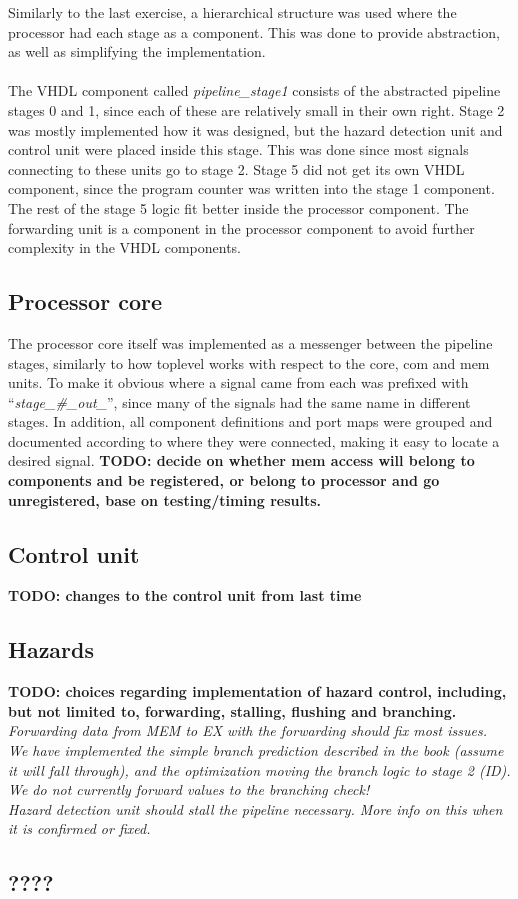 Similarly to the last exercise, a hierarchical structure was used where the
processor had each stage as a component. This was done to provide abstraction,
as well as simplifying the implementation.
\paragraph*{}
The VHDL component called \emph{pipeline\_stage1} consists of the abstracted
pipeline stages 0 and 1, since each of these are relatively small in their own
right. Stage 2 was mostly implemented how it was designed, but the hazard
detection unit and control unit were placed inside this stage. This was done
since most signals connecting to these units go to stage 2. Stage 5 did not get
its own VHDL component, since the program counter was written into the stage 1
component. The rest of the stage 5 logic fit better inside the processor
component. The forwarding unit is a component in the processor component to
avoid further complexity in the VHDL components.

\subsection{Processor core}
The processor core itself was implemented as a messenger between the pipeline
stages, similarly to how toplevel works with respect to the core, com and mem
units. To make it obvious where a signal came from each was prefixed with
``\emph{stage\_\#\_out\_}'', since many of the signals had the same name in different
stages. In addition, all component definitions and port maps were grouped and
documented according to where they were connected, making it easy to locate a
desired signal.\newline
\textbf{TODO: decide on whether mem access will belong to components and be registered, or belong to processor and go unregistered, base on testing/timing results.}

\subsection{Control unit}
\textbf{TODO: changes to the control unit from last time}
\subsection{Hazards}
\textbf{TODO: choices regarding implementation of hazard control, including, but not limited to, forwarding, stalling, flushing and branching.}
\emph{Forwarding data from MEM to EX with the forwarding should fix most issues.
\\
We have implemented the simple branch prediction described in the book
(assume it will fall through), and the optimization moving the branch logic to
stage 2 (ID). We do not currently forward values to the branching check!
\\
Hazard detection unit should stall the pipeline necessary. More info on this
when it is confirmed or fixed.}

\subsection{????}